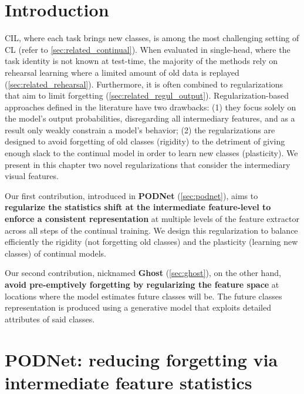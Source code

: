 \minitoc
{}


\section{Introduction}

\acf{CIL}, where each task brings new classes, is among the most challenging setting of \acf{CL}
(refer to \autoref{sec:related_continual}). When evaluated in single-head, where the task identity
is not known at test-time, the majority of the methods rely on rehearsal learning where a limited
amount of old data is replayed (\autoref{sec:related_rehearsal}). Furthermore, it is often combined
to regularizations that aim to limit forgetting (\autoref{sec:related_regul_output}).
Regularization-based approaches defined in the literature have two drawbacks: (1) they focus solely
on the model's output probabilities, disregarding all intermediary features, and as a result only
weakly constrain a model's behavior; (2) the regularizations are designed to avoid forgetting of old
classes (rigidity) to the detriment of giving enough slack to the continual model in order to learn
new classes (plasticity). We present in this chapter two novel regularizations that consider the
intermediary visual features.

Our first contribution, introduced in \textbf{PODNet} (\autoref{sec:podnet}), aims to
\textbf{regularize the statistics shift at the intermediate feature-level to enforce a consistent
    representation} at multiple levels of the feature extractor across all steps of the continual
training. We design this regularization to balance efficiently the rigidity (not forgetting old
classes) and the plasticity (learning new classes) of continual models.

Our second contribution, nicknamed \textbf{Ghost} (\autoref{sec:ghost}), on the other hand,
\textbf{avoid pre-emptively forgetting by regularizing the feature space} at locations where the
model estimates future classes will be. The future classes representation is produced using a
generative model that exploits detailed attributes of said classes.

\section{PODNet: reducing forgetting via intermediate feature statistics}
\label{sec:podnet}

